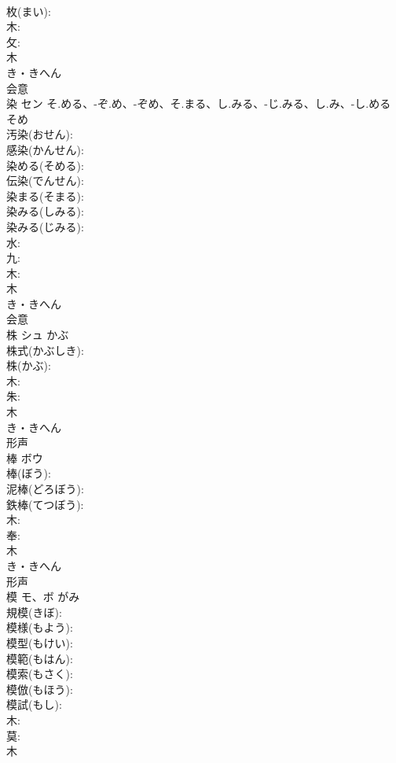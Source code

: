 \documentclass[8pt]{extreport}
\begin{document}
\begin{CJK}{UTF8}{min}
\\	枚(まい): 
\\	木: 
\\	攵: 
\\	木	
\\	き・きへん	
\\	会意 
\\	染	セン	そ.める、-ぞ.め、-ぞめ、そ.まる、し.みる、-じ.みる、し.み、-し.める	そめ	
\\	汚染(おせん): 
\\	感染(かんせん): 
\\	染める(そめる): 
\\	伝染(でんせん): 
\\	染まる(そまる): 
\\	染みる(しみる): 
\\	染みる(じみる): 
\\	水: 
\\	九: 
\\	木: 
\\	木	
\\	き・きへん	
\\	会意 
\\	株	シュ	かぶ		
\\	株式(かぶしき): 
\\	株(かぶ): 
\\	木: 
\\	朱: 
\\	木	
\\	き・きへん	
\\	形声 
\\	棒	ボウ			
\\	棒(ぼう): 
\\	泥棒(どろぼう): 
\\	鉄棒(てつぼう): 
\\	木: 
\\	奉: 
\\	木	
\\	き・きへん	
\\	形声 
\\	模	モ、ボ		がみ	
\\	規模(きぼ): 
\\	模様(もよう): 
\\	模型(もけい): 
\\	模範(もはん): 
\\	模索(もさく): 
\\	模倣(もほう): 
\\	模試(もし): 
\\	木: 
\\	莫: 
\\	木	

\end{CJK}
\end{document}
